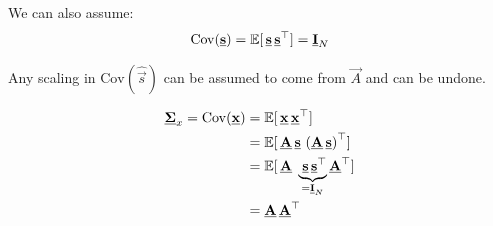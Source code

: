 \begin{frame}{\subsecname}

We can also assume:
\begin{equation}
\mathrm{Cov}(\underline{\mathbf{s}}) = \mathbb{E} \lbrack \, \underline{\mathbf{s}} \, \underline{\mathbf{s}}^\top \rbrack = \underline{\mathbf{I}}_N
\end{equation}

Any scaling in $\mathrm{Cov}(\widehat{\vec s})$ can be assumed to come from $\vec A$ and can be undone.

\pause

\begin{align}
\label{eq:expxina}
\vec \Sigma_x = \mathrm{Cov}(\vec x) &=  \E \lbrack \, \vec x \, \vec x^\top \rbrack\\
&=  \E \lbrack \, \vec A\,\vec s \, \left( \vec A\,\vec s \right)^\top \rbrack\\
&=  \E \lbrack \, \vec A\; \underbrace{\;\vec s \, \vec s^\top}_{= \vec I_N} \vec A^\top \rbrack\\
\label{eq:sigmax}
&=  \vec A\, \vec A^\top
\end{align}

\end{frame}

